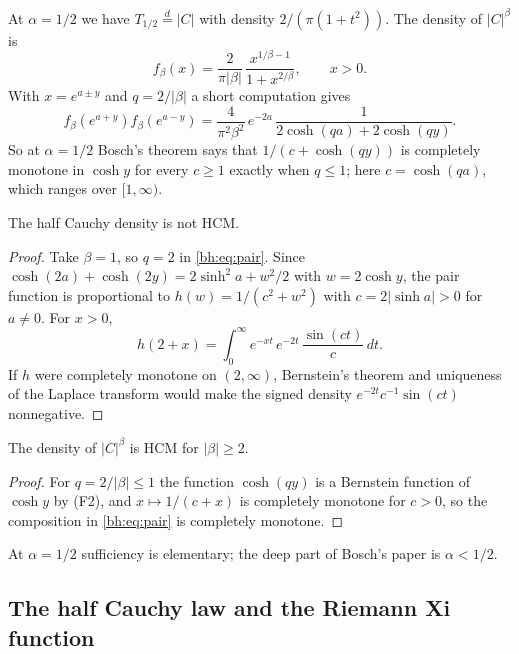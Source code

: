 At $\alpha=1/2$ we have $T_{1/2}\stackrel{d}{=}|C|$ with density $2/(\pi(1+t^2))$. The density of $|C|^\beta$ is
\[
f_\beta(x)=\frac{2}{\pi|\beta|}\,\frac{x^{1/\beta-1}}{1+x^{2/\beta}},\qquad x>0 .
\]
With $x=e^{a\pm y}$ and $q=2/|\beta|$ a short computation gives
\begin{equation}\label{bh:eq:pair}
f_\beta(e^{a+y})f_\beta(e^{a-y})=\frac{4}{\pi^2\beta^2}\,e^{-2a}\,\frac{1}{2\cosh(qa)+2\cosh(qy)} .
\end{equation}
So at $\alpha=1/2$ Bosch's theorem says that $1/(c+\cosh(qy))$ is completely monotone in $\cosh y$ for every $c\ge1$ exactly when $q\le 1$; here $c=\cosh(qa)$, which ranges over $[1,\infty)$.

\begin{proposition}\label{bh:prop:notHCM}
The half Cauchy density is not HCM.
\end{proposition}

\begin{proof}
Take $\beta=1$, so $q=2$ in \eqref{bh:eq:pair}. Since $\cosh(2a)+\cosh(2y)=2\sinh^2a+w^2/2$ with $w=2\cosh y$, the pair function is proportional to $h(w)=1/(c^2+w^2)$ with $c=2|\sinh a|>0$ for $a\ne0$. For $x>0$,
\[
h(2+x)=\int_0^\infty e^{-xt}\,e^{-2t}\,\frac{\sin(ct)}{c}\,dt .
\]
If $h$ were completely monotone on $(2,\infty)$, Bernstein's theorem and uniqueness of the Laplace transform would make the signed density $e^{-2t}c^{-1}\sin(ct)$ nonnegative.
\end{proof}

\begin{proposition}\label{bh:prop:square}
The density of $|C|^\beta$ is HCM for $|\beta|\ge2$.
\end{proposition}

\begin{proof}
For $q=2/|\beta|\le1$ the function $\cosh(qy)$ is a Bernstein function of $\cosh y$ by (F2), and $x\mapsto 1/(c+x)$ is completely monotone for $c>0$, so the composition in \eqref{bh:eq:pair} is completely monotone.
\end{proof}

At $\alpha=1/2$ sufficiency is elementary; the deep part of Bosch's paper is $\alpha<1/2$.

\subsection{The half Cauchy law and the Riemann Xi function}\label{bh:sec:dict}

